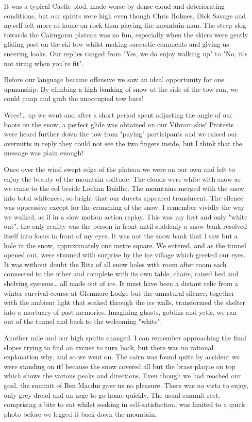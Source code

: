 \documentclass[a5paper,openany,font 10pt]{scrbook}
\begin{document}
It was a typical Castle plod, made worse by dense cloud and
deteriorating conditions, but our spirits were high even though
Chris Holmes, Dick Savage and myself felt more at home on rock
than playing the mountain man. The steep slog towards the
Cairngorm plateau was no fun, especially when the skiers were
gently gliding past on the ski tow whilst making sarcastic
comments and giving us sneering looks. Our replies ranged from
"Yes, we do enjoy walking up" to "No, it's not tiring when you're
fit".

Before our language became offensive we saw an ideal
opportunity for one upmanship. By climbing a high banking of snow
at the side of the tow run, we could jump and grab the unoccupied
tow bars!

Weee!\ldots{} up we went and after a short period spent adjusting
the angle of our boots on the snow, a perfect glide was obtained
on our Vibram skis! Protests were heard further down the tow from
"paying" participants and we raised our overmitts in reply  they
could not see the two fingers inside, but I think that the
message was plain enough!

Once over the wind swept edge of the plateau we were on our
own and left to enjoy the beauty of the mountain solitude. The
clouds were white with snow as we came to the col beside Lochan
Buidhe. The mountains merged with the snow into total whiteness,
so bright that our duvets appeared translucent. The silence was
oppressive except for the crunching of the snow. I remember
vividly the way we walked, as if in a slow motion action replay.
This was my first and only "white out", the only reality was
the person in front until suddenly a snow bank resolved itself
into focus in front of my eyes. It was not the snow bank that I
saw but a hole in the snow,  approximately one metre square.
We entered, and as the tunnel opened out, were stunned with
surprise by the ice village which greeted our eyes. It was
without doubt the Ritz of all snow holes with room after room
each connected to the other and complete with its own table,
chairs, raised bed and shelving systems\ldots{} all made out of ice.
It must have been a distant relic from a winter survival course
at Glenmore Lodge but the unnatural silence, together with the
ambient light that soaked through the ice walls, transformed the
shelter into a mortuary of past memories. Imagining ghosts,
goblins and yetis, we ran out of the tunnel and back to the
welcoming "white".

Another mile and our high spirits changed.  I can remember
approaching the final slopes trying to find an excuse to turn
back, but there was no rational explanation why, and so we went
on. The cairn was found quite by accident  we were standing on
it!  because the snow covered all but the brass plaque on top
which shows the various peaks and directions. Even though we had
reached our goal, the summit of Ben Macdui gave us no pleasure.
There was no vista to enjoy, only grey dread and an urge to go
home quickly. The usual summit rest, comprising a bite to eat
whilst soaking in self-satisfaction, was limited to a quick photo
before we legged it back down the mountain.
\end{document}

